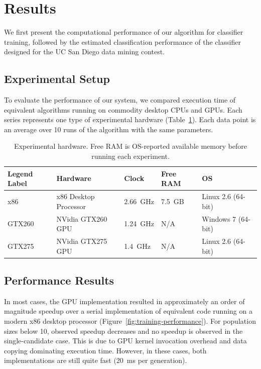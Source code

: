 \documentclass[11pt]{article}       %
\begin{document}
\section{Results} \label{results}
We first present the computational performance of our algorithm for classifier training, followed by the estimated classification performance of the classifier designed for the UC San Diego data mining contest.

\subsection{Experimental Setup} \label{experiment}
To evaluate the performance of our system, we compared execution time of equivalent algorithms running on commodity desktop CPUs and GPUs. Each series represents one type of experimental hardware (Table~\ref{tab:experimental-hardware}). Each data point is an average over 10 runs of the algorithm with the same parameters.

\begin{table}[h]
	\centering
	\begin{tabular}{lllll}
	\textbf{Legend Label} & \textbf{Hardware} & \textbf{Clock} & \textbf{Free RAM} & \textbf{OS} \\
	\hline
	x86    & x86 Desktop Processor  & 2.66~GHz & 7.5~GB & Linux 2.6 (64-bit) \\
	GTX260 & NVidia GTX260 GPU      & 1.24~GHz & N/A    & Windows 7 (64-bit) \\
	GTX275 & NVidia GTX275 GPU      & 1.4~GHz  & N/A    & Linux 2.6 (64-bit) \\
	\hline
	\end{tabular}
	\caption{Experimental hardware. Free RAM is OS-reported available memory before running each experiment.}
	\label{tab:experimental-hardware}
\end{table}

\subsection{Performance Results} \label{performance}
In most cases, the GPU implementation resulted in approximately an order of magnitude speedup over a serial implementation of equivalent code running on a modern x86 desktop processor (Figure~\ref{fig:training-performance}). For population sizes below 10, observed speedup decreases and no speedup is observed in the single-candidate case. This is due to GPU kernel invocation overhead and data copying dominating execution time. However, in these cases, both implementations are still quite fast (20~ms per generation).
\end{document}
